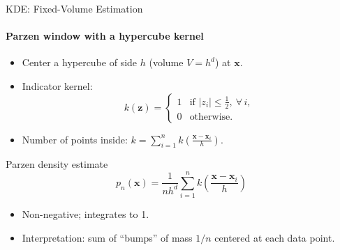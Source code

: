 \begin{frame}{KDE: Fixed-Volume Estimation}
  \framesubtitle{Parzen window with a hypercube kernel}
  \begin{itemize}
    \item Center a hypercube of side $h$ (volume $V = h^d$) at $\mathbf{x}$.
    \item Indicator kernel:
    \[
      k(\mathbf{z}) =
      \begin{cases}
        1 & \text{if } |z_i| \le \tfrac{1}{2},\ \forall\, i,\\
        0 & \text{otherwise.}
      \end{cases}
    \]
    \item Number of points inside: $\displaystyle k = \sum_{i=1}^n k\!\left(\frac{\mathbf{x}-\mathbf{x}_i}{h}\right)$.
  \end{itemize}
  \begin{block}{Parzen density estimate}
    \[
      p_n(\mathbf{x}) = \frac{1}{n h^d}\sum_{i=1}^{n} k\!\left(\frac{\mathbf{x}-\mathbf{x}_i}{h}\right)
    \]
  \end{block}
  \begin{itemize}
    \item Non-negative; integrates to 1.
    \item Interpretation: sum of ``bumps'' of mass $1/n$ centered at each data point.
  \end{itemize}
\end{frame}


